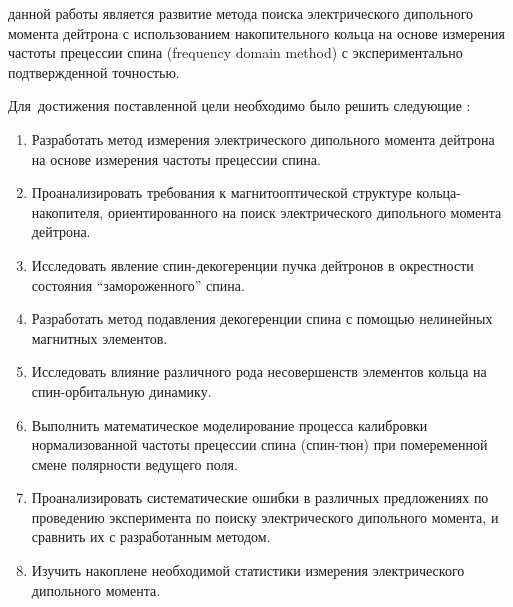 

{\aim} данной работы является развитие метода поиска электрического дипольного момента дейтрона с использованием накопительного кольца на основе измерения частоты прецессии спина (frequency domain method) с экспериментально подтвержденной точностью.

Для~достижения поставленной цели необходимо было решить следующие {\tasks}:
\begin{enumerate}
	\item Разработать метод измерения электрического дипольного момента дейтрона на основе измерения частоты прецессии спина.
	\item Проанализировать требования к магнитооптической структуре кольца-накопителя, ориентированного на поиск электрического дипольного момента дейтрона.
	\item Исследовать явление спин-декогеренции пучка дейтронов в окрестности состояния ``замороженного'' спина. 
	\item Разработать метод подавления декогеренции спина с помощью нелинейных магнитных элементов.
	\item Исследовать влияние различного рода несовершенств элементов кольца на спин-орбитальную динамику. 
	\item Выполнить математическое моделирование процесса калибровки нормализованной частоты прецессии спина (спин-тюн) при помеременной смене полярности ведущего поля.
	\item Проанализировать систематические ошибки в различных предложениях по проведению эксперимента по поиску электрического дипольного момента, и сравнить их с разработанным методом. 
	\item Изучить накоплене необходимой статистики измерения электрического дипольного момента.
\end{enumerate}

